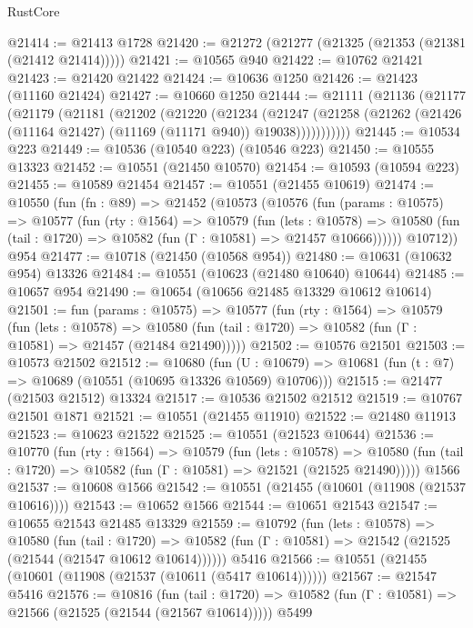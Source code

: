 \begin{lexlean}{RustCore}
\begin{coremodule}
@21414 := @21413 @1728
@21420 := @21272 (@21277 (@21325 (@21353 (@21381 (@21412 @21414)))))
@21421 := @10565 @940
@21422 := @10762 @21421
@21423 := @21420 @21422
@21424 := @10636 @1250
@21426 := @21423 (@11160 @21424)
@21427 := @10660 @1250
@21444 := @21111
    (@21136
      (@21177
        (@21179
          (@21181
            (@21202
              (@21220
                (@21234
                  (@21247
                    (@21258 (@21262 (@21426 (@11164 @21427) (@11169 (@11171 @940)) @19038)))))))))))
@21445 := @10534 @223
@21449 := @10536 (@10540 @223) (@10546 @223)
@21450 := @10555 @13323
@21452 := @10551 (@21450 @10570)
@21454 := @10593 (@10594 @223)
@21455 := @10589 @21454
@21457 := @10551 (@21455 @10619)
@21474 := @10550
    (fun (fn : @89) =>
    @21452
      (@10573
        (@10576
          (fun (params : @10575) =>
          @10577
            (fun (rty : @1564) =>
            @10579
              (fun (lets : @10578) =>
              @10580 (fun (tail : @1720) => @10582 (fun (Γ : @10581) => @21457 @10666))))))
        @10712))
    @954
@21477 := @10718 (@21450 (@10568 @954))
@21480 := @10631 (@10632 @954) @13326
@21484 := @10551 (@10623 (@21480 @10640) @10644)
@21485 := @10657 @954
@21490 := @10654 (@10656 @21485 @13329 @10612 @10614)
@21501 := fun (params : @10575) =>
  @10577
    (fun (rty : @1564) =>
    @10579
      (fun (lets : @10578) =>
      @10580 (fun (tail : @1720) => @10582 (fun (Γ : @10581) => @21457 (@21484 @21490)))))
@21502 := @10576 @21501
@21503 := @10573 @21502
@21512 := @10680
    (fun (U : @10679) => @10681 (fun (t : @7) => @10689 (@10551 (@10695 @13326 @10569) @10706)))
@21515 := @21477 (@21503 @21512) @13324
@21517 := @10536 @21502 @21512
@21519 := @10767 @21501 @1871
@21521 := @10551 (@21455 @11910)
@21522 := @21480 @11913
@21523 := @10623 @21522
@21525 := @10551 (@21523 @10644)
@21536 := @10770
    (fun (rty : @1564) =>
    @10579
      (fun (lets : @10578) =>
      @10580 (fun (tail : @1720) => @10582 (fun (Γ : @10581) => @21521 (@21525 @21490)))))
    @1566
@21537 := @10608 @1566
@21542 := @10551 (@21455 (@10601 (@11908 (@21537 @10616))))
@21543 := @10652 @1566
@21544 := @10651 @21543
@21547 := @10655 @21543 @21485 @13329
@21559 := @10792
    (fun (lets : @10578) =>
    @10580
      (fun (tail : @1720) =>
      @10582 (fun (Γ : @10581) => @21542 (@21525 (@21544 (@21547 @10612 @10614))))))
    @5416
@21566 := @10551 (@21455 (@10601 (@11908 (@21537 (@10611 (@5417 @10614))))))
@21567 := @21547 @5416
@21576 := @10816
    (fun (tail : @1720) => @10582 (fun (Γ : @10581) => @21566 (@21525 (@21544 (@21567 @10614)))))
    @5499

\end{coremodule}
\end{lexlean}
